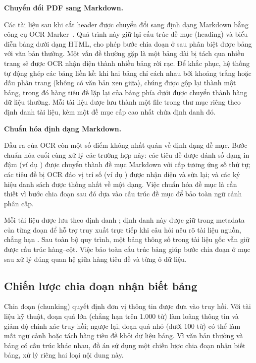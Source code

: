 \documentclass[../DoAn.tex]{subfiles}
\begin{document}
\noindent\textbf{Chuyển đổi PDF sang Markdown.}

Các tài liệu sau khi cắt header được chuyển đổi sang định dạng Markdown bằng công cụ OCR Marker~\cite{marker2024}. Quá trình này giữ lại cấu trúc đề mục (heading) và biểu diễn bảng dưới dạng HTML, cho phép bước chia đoạn ở sau phân biệt được bảng với văn bản thường. Một vấn đề thường gặp là một bảng dài bị tách qua nhiều trang sẽ được OCR nhận diện thành nhiều bảng rời rạc. Để khắc phục, hệ thống tự động ghép các bảng liền kề: khi hai bảng chỉ cách nhau bởi khoảng trắng hoặc dấu phân trang (không có văn bản xen giữa), chúng được gộp lại thành một bảng, trong đó hàng tiêu đề lặp lại của bảng phía dưới được chuyển thành hàng dữ liệu thường. Mỗi tài liệu được lưu thành một file  trong thư mục riêng theo định danh tài liệu, kèm một đề mục cấp cao nhất chứa định danh đó.

\noindent\textbf{Chuẩn hóa định dạng Markdown.}

Đầu ra của OCR còn một số điểm không nhất quán về định dạng đề mục. Bước chuẩn hóa cuối cùng xử lý các trường hợp này: các tiêu đề được đánh số dạng in đậm (ví dụ ) được chuyển thành đề mục Markdown với cấp tương ứng số thứ tự; các tiêu đề bị OCR đảo vị trí số (ví dụ ) được nhận diện và sửa lại; và các ký hiệu danh sách được thống nhất về một dạng. Việc chuẩn hóa đề mục là cần thiết vì bước chia đoạn sau đó dựa vào cấu trúc đề mục để bảo toàn ngữ cảnh phân cấp.

Mỗi tài liệu được lưu theo định danh ; định danh này được giữ trong metadata của từng đoạn để hỗ trợ truy xuất trực tiếp khi câu hỏi nêu rõ tài liệu nguồn, chẳng hạn . Sau toàn bộ quy trình, một bảng thông số trong tài liệu gốc vẫn giữ được cấu trúc hàng--cột. Việc bảo toàn cấu trúc bảng giúp bước chia đoạn ở mục sau xử lý đúng quan hệ giữa hàng tiêu đề và từng ô dữ liệu.

\subsection{Chiến lược chia đoạn nhận biết bảng}
\label{subsection:3.2.2}

Chia đoạn (chunking) quyết định đơn vị thông tin được đưa vào truy hồi. Với tài liệu kỹ thuật, đoạn quá lớn (chẳng hạn trên 1.000 từ) làm loãng thông tin và giảm độ chính xác truy hồi; ngược lại, đoạn quá nhỏ (dưới 100 từ) có thể làm mất ngữ cảnh hoặc tách hàng tiêu đề khỏi dữ liệu bảng. Vì văn bản thường và bảng có cấu trúc khác nhau, đồ án sử dụng một chiến lược chia đoạn nhận biết bảng, xử lý riêng hai loại nội dung này.
\end{document}

